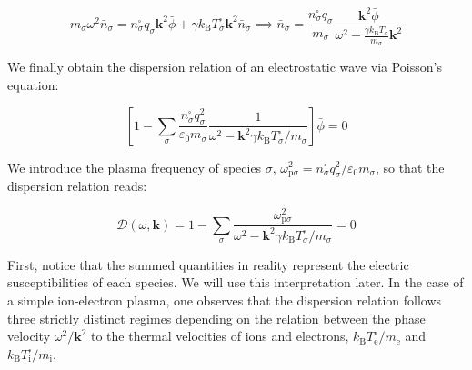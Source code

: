 \begin{equation}
    m_\sigma\omega^2\bar{n}_\sigma=n_\sigma^\square q_\sigma\mathbf{k}^2\bar{\phi}+\gamma k_\mathrm{B}T_\sigma^\square\mathbf{k}^2\bar{n}_\sigma\implies\bar{n}_\sigma=\frac{n_\sigma^\square q_\sigma}{m_\sigma}\frac{\mathbf{k}^2\bar{\phi}}{\omega^2-\frac{\gamma k_\mathrm{B}T_\sigma}{m_\sigma}\mathbf{k}^2}
\end{equation}

We finally obtain the dispersion relation of an electrostatic wave via Poisson's equation:

\begin{equation}
    \left[1-\sum_{\sigma}\frac{n_\sigma^\square q_\sigma^2}{\varepsilon_0m_\sigma}\frac{1}{\omega^2-\mathbf{k}^2\gamma k_\mathrm{B}T_\sigma^\square/m_\sigma}\right]\bar{\phi}=0
\end{equation}

We introduce the plasma frequency of species $\sigma$, $\omega_{\mathrm{p}\sigma}^2=n_\sigma^\square q_\sigma^2/\varepsilon_0m_\sigma$, so that the dispersion relation reads:

\begin{equation}
    \mathcal{D}(\omega,\mathbf{k})=1-\sum_{\sigma}\frac{\omega_{\mathrm{p}\sigma}^2}{\omega^2-\mathbf{k}^2\gamma k_\mathrm{B}T_\sigma^\square/m_\sigma}=0
\end{equation}

First, notice that the summed quantities in reality represent the electric susceptibilities of each species. We will use this interpretation later. In the case of a simple ion-electron plasma, one observes that the dispersion relation follows three strictly distinct regimes depending on the relation between the phase velocity $\omega^2/\mathbf{k}^2$ to the thermal velocities of ions and electrons, $k_\mathrm{B}T_\text{e}^\square/m_\text{e}$ and $k_\mathrm{B}T_\mathrm{i}^\square/m_\mathrm{i}$.

